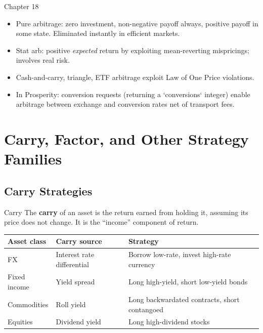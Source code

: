 \documentclass[12pt,a4paper,openany]{report}
\theoremstyle{definition}
\begin{document}
\begin{takeawaybox}{Chapter 18}
\begin{itemize}
  \item Pure arbitrage: zero investment, non-negative payoff always, positive payoff in some state. Eliminated instantly in efficient markets.
  \item Stat arb: positive \emph{expected} return by exploiting mean-reverting mispricings; involves real risk.
  \item Cash-and-carry, triangle, ETF arbitrage exploit Law of One Price violations.
  \item In Prosperity: conversion requests (returning a `conversions` integer) enable arbitrage between exchange and conversion rates net of transport fees.
\end{itemize}
\end{takeawaybox}


\chapter{Carry, Factor, and Other Strategy Families}

\section{Carry Strategies}

\begin{definitionbox}{Carry}
The \textbf{carry} of an asset is the return earned from holding it, assuming its price does not change. It is the ``income'' component of return.
\end{definitionbox}

\begin{center}
\begin{tabular}{lll}
\toprule
\textbf{Asset class} & \textbf{Carry source} & \textbf{Strategy} \\
\midrule
FX & Interest rate differential & Borrow low-rate, invest high-rate currency \\
Fixed income & Yield spread & Long high-yield, short low-yield bonds \\
Commodities & Roll yield & Long backwardated contracts, short contangoed \\
Equities & Dividend yield & Long high-dividend stocks \\
\bottomrule
\end{tabular}
\end{center}
\end{document}
